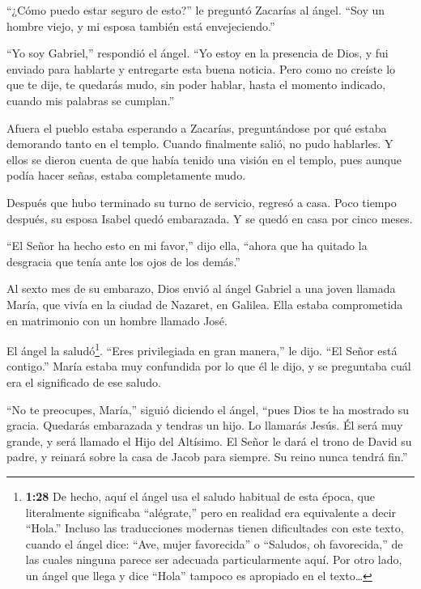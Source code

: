  ``¿Cómo puedo estar seguro de esto?'' le preguntó Zacarías
al ángel. ``Soy un hombre viejo, y mi esposa también está
envejeciendo.''

 ``Yo soy Gabriel,'' respondió el ángel. ``Yo estoy en la
presencia de Dios, y fui enviado para hablarte y entregarte esta buena
noticia.  Pero como no creíste lo que te dije, te quedarás
mudo, sin poder hablar, hasta el momento indicado, cuando mis palabras
se cumplan.''

 Afuera el pueblo estaba esperando a Zacarías,
preguntándose por qué estaba demorando tanto en el templo. 
Cuando finalmente salió, no pudo hablarles. Y ellos se dieron cuenta de
que había tenido una visión en el templo, pues aunque podía hacer señas,
estaba completamente mudo.

 Después que hubo terminado su turno de servicio, regresó a
casa.  Poco tiempo después, su esposa Isabel quedó
embarazada. Y se quedó en casa por cinco meses.

 ``El Señor ha hecho esto en mi favor,'' dijo ella, ``ahora
que ha quitado la desgracia que tenía ante los ojos de los demás.''

 Al sexto mes de su embarazo, Dios envió al ángel Gabriel a
una joven llamada María, que vivía en la ciudad de Nazaret, en Galilea.
 Ella estaba comprometida en matrimonio con un hombre
llamado José.

 El ángel la saludó\footnote{\textbf{1:28} De hecho, aquí
  el ángel usa el saludo habitual de esta época, que literalmente
  significaba ``alégrate,'' pero en realidad era equivalente a decir
  ``Hola.'' Incluso las traducciones modernas tienen dificultades con
  este texto, cuando el ángel dice: ``Ave, mujer favorecida'' o
  ``Saludos, oh favorecida,'' de las cuales ninguna parece ser adecuada
  particularmente aquí. Por otro lado, un ángel que llega y dice
  ``Hola'' tampoco es apropiado en el texto\ldots{}}. ``Eres
privilegiada en gran manera,'' le dijo. ``El Señor está contigo.''
 María estaba muy confundida por lo que él le dijo, y se
preguntaba cuál era el significado de ese saludo.

 ``No te preocupes, María,'' siguió diciendo el ángel,
``pues Dios te ha mostrado su gracia.  Quedarás embarazada
y tendras un hijo. Lo llamarás Jesús.  Él será muy grande,
y será llamado el Hijo del Altísimo. El Señor le dará el trono de David
su padre,  y reinará sobre la casa de Jacob para siempre.
Su reino nunca tendrá fin.''

